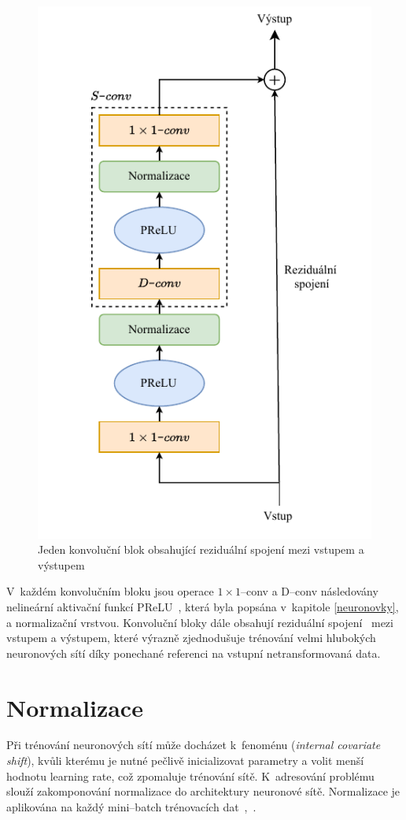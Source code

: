 \begin{figure}[H]
    \centering
    \includegraphics[scale=1.0]{obrazky-figures/conv-res-block.pdf}
    \caption{\label{fig:tasnet-convblock}Jeden konvoluční blok obsahující reziduální spojení mezi vstupem a výstupem}
\end{figure}

V~každém konvolučním bloku jsou operace $1 \times 1$--conv a D--conv následovány nelineární aktivační funkcí PReLU~\cite{he2015delving}, která byla popsána v~kapitole \ref{neuronovky}, a normalizační vrstvou. Konvoluční bloky dále obsahují reziduální spojení~\cite{he2015deep} mezi vstupem a výstupem, které výrazně zjednodušuje trénování velmi hlubokých neuronových sítí díky ponechané referenci na vstupní netransformovaná data.


\section{Normalizace}
Při trénování neuronových sítí může docházet k~fenoménu  (\textit{internal covariate shift}), kvůli kterému je nutné pečlivě inicializovat parametry a volit menší hodnotu learning rate, což zpomaluje trénování sítě. K~adresování problému slouží zakomponování normalizace do architektury neuronové sítě. Normalizace je aplikována na každý mini--batch trénovacích dat~\cite{ioffe2015batch},~\cite{ba2016layer}.

